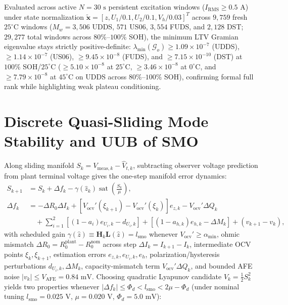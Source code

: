 \documentclass[11pt,a4paper]{article}
\begin{document}
Evaluated across active $N=30\text{ s}$ persistent excitation windows ($I_{\text{RMS}} \ge 0.5\text{ A}$) under state normalization $\tilde{\mathbf{x}} = [z, U_1/0.1, U_2/0.1, V_h/0.03]^T$ across $9,759$ fresh $25^\circ\text{C}$ windows ($M_w = 3,506$ UDDS, $571$ US06, $3,554$ FUDS, and $2,128$ DST; $29,277$ total windows across $80\%\text{--}100\%$ SOH), the minimum LTV Gramian eigenvalue stays strictly positive-definite: $\lambda_{\min}(\mathcal{G}_o) \ge 1.09 \times 10^{-7}$ (UDDS), $\ge 1.14 \times 10^{-7}$ (US06), $\ge 9.45 \times 10^{-8}$ (FUDS), and $\ge 7.15 \times 10^{-10}$ (DST) at $100\%$ SOH/$25^\circ\text{C}$ ($\ge 5.10 \times 10^{-8}$ at $25^\circ\text{C}$, $\ge 3.46 \times 10^{-8}$ at $0^\circ\text{C}$, and $\ge 7.79 \times 10^{-8}$ at $45^\circ\text{C}$ on UDDS across $80\%\text{--}100\%$ SOH), confirming formal full rank while highlighting weak plateau conditioning.

\section{Discrete Quasi-Sliding Mode Stability and UUB of SMO\label{app:lyapunov}}
Along sliding manifold $S_k = V_{\text{meas},k} - \hat{V}_{t,k}$, subtracting observer voltage prediction from plant terminal voltage gives the one-step manifold error dynamics:
\begin{align*}
S_{k+1} &= S_k + \Delta f_k - \gamma(\hat{z}_k)\operatorname{sat}\!\left(\frac{S_k}{\mu}\right), \\
\Delta f_k &= -\Delta R_0 \Delta I_k + \left[V_{\text{ocv}}'(\xi_{k+1}) - V_{\text{ocv}}'(\xi_k)\right] e_{z,k} - V_{\text{ocv}}'\Delta Q_k \\
&\quad + \sum_{i=1}^2 \left[(1-a_i)e_{U_i,k} - d_{U_i,k}\right] + \left[(1-a_{h,k})e_{h,k} - \Delta M_k\right] + (v_{k+1} - v_k),
\end{align*}
with scheduled gain $\gamma(\hat{z}) \equiv \mathbf{H}_k\mathbf{L}(\hat{z}) = l_{\text{smo}}$ whenever $V_{\text{ocv}}' \ge \alpha_{\min}$, ohmic mismatch $\Delta R_0 = R_0^{\text{plant}} - R_0^{\text{nom}}$ across step $\Delta I_k = I_{k+1} - I_k$, intermediate OCV points $\xi_k, \xi_{k+1}$, estimation errors $e_{z,k}, e_{U_i,k}, e_h$, polarization/hysteresis perturbations $d_{U_i,k}, \Delta M_k$, capacity-mismatch term $V_{\text{ocv}}'\Delta Q_k$, and bounded AFE noise $|v_k| \le V_{\text{AFE}} = 0.84\text{ mV}$. Choosing quadratic Lyapunov candidate $V_k = \tfrac{1}{2}S_k^2$ yields two properties whenever $|\Delta f_k| \le \Phi_d < l_{\text{smo}} < 2\mu - \Phi_d$ (under nominal tuning $l_{\text{smo}} = 0.025\text{ V}$, $\mu = 0.020\text{ V}$, $\Phi_d = 5.0\text{ mV}$):
\end{document}
